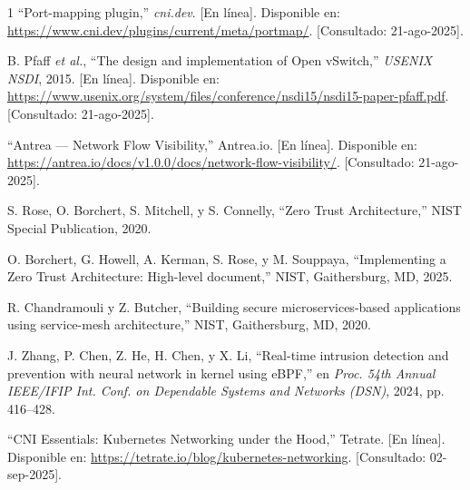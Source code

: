 \documentclass[journal]{IEEEtran}
\begin{document}
\begin{thebibliography}{1}
``Port-mapping plugin,'' \emph{cni.dev}. [En línea]. Disponible en: \url{https://www.cni.dev/plugins/current/meta/portmap/}. [Consultado: 21-ago-2025].

B. Pfaff \emph{et al.}, ``The design and implementation of Open vSwitch,'' \emph{USENIX NSDI}, 2015. [En línea]. Disponible en: \url{https://www.usenix.org/system/files/conference/nsdi15/nsdi15-paper-pfaff.pdf}. [Consultado: 21-ago-2025].

``Antrea — Network Flow Visibility,'' Antrea.io. [En línea]. Disponible en: \url{https://antrea.io/docs/v1.0.0/docs/network-flow-visibility/}. [Consultado: 21-ago-2025].

S. Rose, O. Borchert, S. Mitchell, y S. Connelly, ``Zero Trust Architecture,'' NIST Special Publication, 2020.

O. Borchert, G. Howell, A. Kerman, S. Rose, y M. Souppaya, ``Implementing a Zero Trust Architecture: High-level document,'' NIST, Gaithersburg, MD, 2025.

R. Chandramouli y Z. Butcher, ``Building secure microservices-based applications using service-mesh architecture,'' NIST, Gaithersburg, MD, 2020.

J. Zhang, P. Chen, Z. He, H. Chen, y X. Li, ``Real-time intrusion detection and prevention with neural network in kernel using eBPF,'' en \emph{Proc. 54th Annual IEEE/IFIP Int. Conf. on Dependable Systems and Networks (DSN)}, 2024, pp. 416--428.

``CNI Essentials: Kubernetes Networking under the Hood,'' Tetrate. [En línea]. Disponible en: \url{https://tetrate.io/blog/kubernetes-networking}. [Consultado: 02-sep-2025].
\end{thebibliography}

% 
\end{document}
